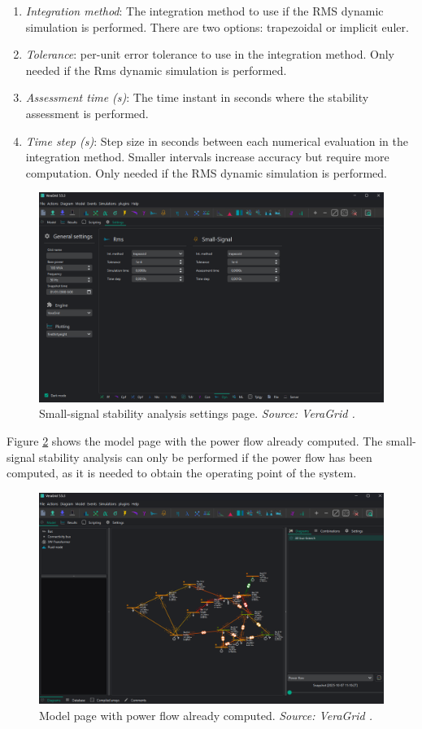 \begin{enumerate}
  \item \textit{Integration method}: The integration method to use if the RMS dynamic simulation is performed. There are two options: trapezoidal or implicit euler.
  \item \textit{Tolerance}: per-unit error tolerance to use in the integration method. Only needed if the Rms dynamic simulation is performed.
  \item \textit{Assessment time (s)}: The time instant in seconds where the stability assessment is performed.
  \item \textit{Time step (s)}: Step size in seconds between each numerical evaluation in the integration method. 
  Smaller intervals increase accuracy but require more computation. Only needed if the RMS dynamic simulation is performed.
\end{enumerate}


\begin{figure}[H]
  \centering
  \includegraphics[width=0.8\linewidth]{figures/settings_GUI.png}
  \caption{Small-signal stability analysis settings page. \textit{Source: VeraGrid \cite{veragrid}.}}
  \label{fig:smallsignal_settings_GUI}
\end{figure}

Figure \ref{fig:model_powerflow_GUI} shows the model page with the power flow already computed. The small-signal stability analysis can 
only be performed if the power flow has been computed, as it is needed to obtain the operating point of the system.

\begin{figure}[H]
  \centering
  \includegraphics[width=0.8\linewidth]{figures/model_powerflow_GUI.png}
  \caption{Model page with power flow already computed. \textit{Source: VeraGrid \cite{veragrid}.}}
  \label{fig:model_powerflow_GUI}
\end{figure}


